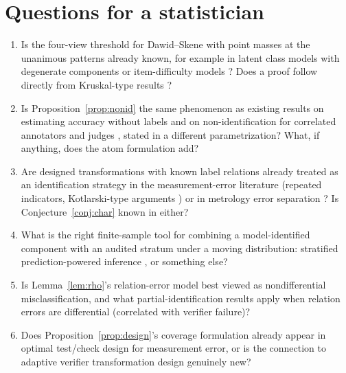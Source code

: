 \documentclass[11pt]{article}
\theoremstyle{definition}
\theoremstyle{remark}
\begin{document}
\section{Questions for a statistician}

\begin{enumerate}
\item Is the four-view threshold for Dawid--Skene with point masses at the unanimous patterns already known, for example in latent class models with degenerate components or item-difficulty models \cite{whitehill2009,allman2009}? Does a proof follow directly from Kruskal-type results \cite{kruskal1977}?
\item Is Proposition~\ref{prop:nonid} the same phenomenon as existing results on estimating accuracy without labels and on non-identification for correlated annotators and judges \cite{platanios2014,jaffe2016,arxiv260908826}, stated in a different parametrization? What, if anything, does the atom formulation add?
\item Are designed transformations with known label relations already treated as an identification strategy in the measurement-error literature (repeated indicators, Kotlarski-type arguments \cite{livuong1998}) or in metrology error separation \cite{donaldson1972,evans1996}? Is Conjecture~\ref{conj:char} known in either?
\item What is the right finite-sample tool for combining a model-identified component with an audited stratum under a moving distribution: stratified prediction-powered inference \cite{angelopoulos2023}, or something else?
\item Is Lemma~\ref{lem:rho}'s relation-error model best viewed as nondifferential misclassification, and what partial-identification results apply when relation errors are differential (correlated with verifier failure)?
\item Does Proposition~\ref{prop:design}'s coverage formulation already appear in optimal test/check design for measurement error, or is the connection to adaptive verifier transformation design genuinely new?
\end{enumerate}
\end{document}
